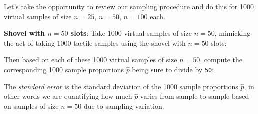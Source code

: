 \documentclass[12pt,]{krantz}
\makeatletter
\newenvironment{Shaded}{\begin{snugshade}}{\end{snugshade}}
\newcommand{\KeywordTok}[1]{\textcolor[rgb]{0.27,0.27,0.27}{\textbf{#1}}}
\newcommand{\DataTypeTok}[1]{\textcolor[rgb]{0.27,0.27,0.27}{#1}}
\newcommand{\DecValTok}[1]{\textcolor[rgb]{0.06,0.06,0.06}{#1}}
\newcommand{\StringTok}[1]{\textcolor[rgb]{0.5,0.5,0.5}{#1}}
\newcommand{\OperatorTok}[1]{\textcolor[rgb]{0.43,0.43,0.43}{\textbf{#1}}}
\newcommand{\NormalTok}[1]{#1}
\newenvironment{kframe}{%
\medskip{}
\setlength{\fboxsep}{.8em}
 \def\at@end@of@kframe{}%
 \ifinner\ifhmode%
  \def\at@end@of@kframe{\end{minipage}}%
  \begin{minipage}{\columnwidth}%
 \fi\fi%
 \def\FrameCommand##1{\hskip\@totalleftmargin \hskip-\fboxsep
 \colorbox{shadecolor}{##1}\hskip-\fboxsep
     \hskip-\linewidth \hskip-\@totalleftmargin \hskip\columnwidth}%
 \MakeFramed {\advance\hsize-\width
   \@totalleftmargin\z@ \linewidth\hsize
   \@setminipage}}%
 {\par\unskip\endMakeFramed%
 \at@end@of@kframe}
\renewenvironment{Shaded}{\begin{kframe}}{\end{kframe}}
\theoremstyle{definition}
\theoremstyle{definition}
\theoremstyle{definition}
\theoremstyle{remark}
\makeatother
\begin{document}
Let's take the opportunity to review our sampling procedure and do this
for 1000 virtual samples of size \(n=25\), \(n=50\), \(n=100\) each.

\textbf{Shovel with \(n=50\) slots}: Take 1000 virtual samples of size
\(n=50\), mimicking the act of taking 1000 tactile samples using the
shovel with \(n=50\) slots:

\begin{Shaded}
\end{Shaded}

Then based on each of these 1000 virtual samples of size \(n=50\),
compute the corresponding 1000 sample proportions \(\widehat{p}\) being
sure to divide by \texttt{50}:

\begin{Shaded}
\end{Shaded}

The \emph{standard error} is the standard deviation of the 1000 sample
proportions \(\widehat{p}\), in other words we are quantifying how much
\(\widehat{p}\) varies from sample-to-sample based on samples of size
\(n=50\) due to sampling variation.

\begin{Shaded}
\end{Shaded}
\end{document}

